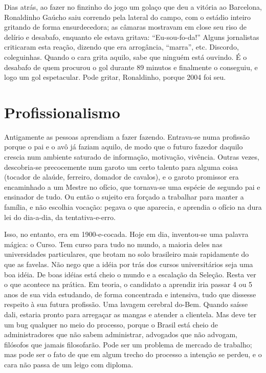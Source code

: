 Dias atrás, ao fazer no finzinho do jogo um golaço que deu a vitória
ao Barcelona, Ronaldinho Gaúcho saiu correndo pela lateral do campo,
com o estádio inteiro gritando de forma ensurdecedora; as câmaras
mostravam em close seu riso de delírio e desabafo, enquanto ele
estava gritava: “Eu-sou-fo-da!”  Alguns jornalistas criticaram esta
reação, dizendo que era arrogância, “marra”, etc.  Discordo,
coleguinhas. Quando o cara grita aquilo, sabe que ninguém está
ouvindo. É o desabafo de quem procurou o gol durante 89 minutos e
finalmente o conseguiu, e logo um gol espetacular.  Pode gritar,
Ronaldinho, porque 2004 foi seu.

\chapter{Profissionalismo}

Antigamente as pessoas aprendiam a fazer fazendo. Entrava-se numa
profissão porque o pai e o avô já faziam aquilo, de modo que o futuro
fazedor daquilo crescia num ambiente saturado de informação,
motivação, vivência. Outras vezes, descobria-se precocemente num
garoto um certo talento para alguma coisa (tocador de alaúde,
ferreiro, domador de cavalos), e o garoto promissor era encaminhado a
um Mestre no ofício, que tornava-se uma espécie de segundo pai e
ensinador de tudo. Ou então o sujeito era forçado a trabalhar para
manter a família, e não escolhia vocação: pegava o que aparecia, e
aprendia o ofício na dura lei do dia-a-dia, da tentativa-e-erro.

Isso, no entanto, era em 1900-e-cocada. Hoje em dia, inventou-se uma
palavra mágica: o Curso. Tem curso para tudo no mundo, a maioria
deles nas universidades particulares, que brotam no solo brasileiro
mais rapidamente do que as favelas. Não nego que a idéia por trás dos
cursos universitários seja uma boa idéia. De boas idéias está cheio o
mundo e a escalação da Seleção. Resta ver o que acontece na prática.
Em teoria, o candidato a aprendiz iria passar 4 ou 5 anos de sua vida
estudando, de forma concentrada e intensiva, tudo que dissesse
respeito à sua futura profissão. Uma lavagem cerebral do-Bem. Quando
saísse dali, estaria pronto para arregaçar as mangas e atender a
clientela. Mas deve ter um bug qualquer no meio do processo, porque o
Brasil está cheio de administradores que não sabem administrar,
advogados que não advogam, filósofos que jamais filosofarão. Pode ser
um problema de mercado de trabalho; mas pode ser o fato de que em
algum trecho do processo a intenção se perdeu, e o cara não passa de
um leigo com diploma.


